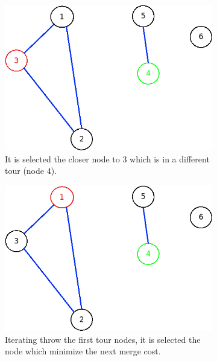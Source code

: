 \begin{figure}[!h]
\begin{subfigure}{.26\columnwidth}
		\includegraphics[width=\columnwidth]{img/patching3.png}
		\caption{It is selected the closer node to $ 3 $ which is in a different tour (node $ 4 $).}
		\label{fig:patching3}
	\end{subfigure}
	\begin{subfigure}{.26\columnwidth}
		\includegraphics[width=\columnwidth]{img/patching4.png}
		\caption{Iterating throw the first tour nodes, it is selected the node which minimize the next merge cost.}
		\label{fig:patching4}
	\end{subfigure}
\hfill%
	\begin{subfigure}{.26\columnwidth}

\end{subfigure}
\end{figure}
